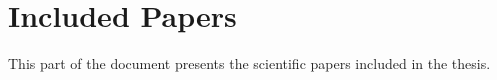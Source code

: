 \documentclass[11pt,a4paper,twoside, openright]{book} %
\begin{document}
	
    \frontmatterCS %
    
    \tableofcontents
    
    \listoftables
    \listoffigures

\mainmatter

    
    
    
    
    
    
    
    

    
    
    \part{Included Papers}
This part of the document presents the scientific papers included in the thesis.

    \backmatter
\end{document}
